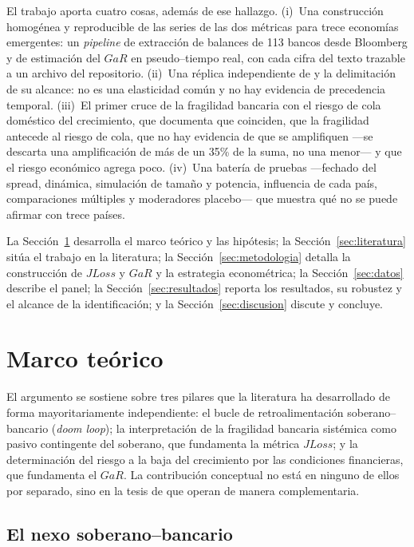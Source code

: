 El trabajo aporta cuatro cosas, además de ese hallazgo. (i)~Una construcción homogénea y reproducible de las series de las dos métricas para trece economías emergentes: un \textit{pipeline} de extracción de balances de 113 bancos desde Bloomberg y de estimación del $GaR$ en pseudo--tiempo real, con cada cifra del texto trazable a un archivo del repositorio. (ii)~Una réplica independiente de \citet{Chari2024b} y la delimitación de su alcance: no es una elasticidad común y no hay evidencia de precedencia temporal. (iii)~El primer cruce de la fragilidad bancaria con el riesgo de cola doméstico del crecimiento, que documenta que coinciden, que la fragilidad antecede al riesgo de cola, que no hay evidencia de que se amplifiquen ---se descarta una amplificación de más de un 35\% de la suma, no una menor--- y que el riesgo económico agrega poco. (iv)~Una batería de pruebas ---fechado del spread, dinámica, simulación de tamaño y potencia, influencia de cada país, comparaciones múltiples y moderadores placebo--- que muestra qué no se puede afirmar con trece países.

La Sección~\ref{sec:marco} desarrolla el marco teórico y las hipótesis; la Sección~\ref{sec:literatura} sitúa el trabajo en la literatura; la Sección~\ref{sec:metodologia} detalla la construcción de $JLoss$ y $GaR$ y la estrategia econométrica; la Sección~\ref{sec:datos} describe el panel; la Sección~\ref{sec:resultados} reporta los resultados, su robustez y el alcance de la identificación; y la Sección~\ref{sec:discusion} discute y concluye.

\section{Marco teórico}
\label{sec:marco}

El argumento se sostiene sobre tres pilares que la literatura ha desarrollado de forma mayoritariamente independiente: el bucle de retroalimentación soberano--bancario (\textit{doom loop}); la interpretación de la fragilidad bancaria sistémica como pasivo contingente del soberano, que fundamenta la métrica $JLoss$; y la determinación del riesgo a la baja del crecimiento por las condiciones financieras, que fundamenta el $GaR$. La contribución conceptual no está en ninguno de ellos por separado, sino en la tesis de que operan de manera complementaria.

\subsection{El nexo soberano--bancario}

